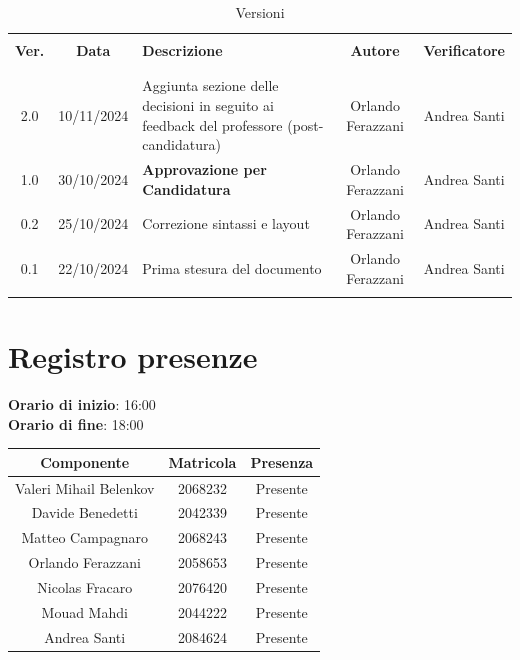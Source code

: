 \documentclass[italian, 12pt]{article}
\begin{document}
\pagestyle{mystyle}


\begin{table}[!h]
	\caption{Versioni}
	\begin{center}
		\begin{tabular}{ c c p{6.2cm} c c}
			\hline \\[-2ex]
			\textbf{Ver.} & \textbf{Data} & \textbf{Descrizione} & \textbf{Autore} & \textbf{Verificatore}  \\
			\\[-2ex] \hline \\[-1.5ex]
            2.0 & 10/11/2024 & Aggiunta sezione delle decisioni in seguito ai feedback del professore (post-candidatura) & Orlando Ferazzani & Andrea Santi\\
            1.0 & 30/10/2024 & \textbf{Approvazione per Candidatura} & Orlando Ferazzani & Andrea Santi\\
            0.2 & 25/10/2024 & Correzione sintassi e layout & Orlando Ferazzani & Andrea Santi\\
			0.1 & 22/10/2024 & Prima stesura del documento & Orlando Ferazzani & Andrea Santi\\
			\\[-1.5ex] \hline
		\end{tabular}
	\end{center}
\end{table}


\tableofcontents
\newpage


\section{Registro presenze}

\textbf{Orario di inizio}: 16:00\\
\textbf{Orario di fine}: 18:00\\


\begin{flushleft}
	\begin{table}[!h]
	\begin{tabular}{ |c|c|c| } 
		\hline
		\textbf{Componente} & \textbf{Matricola} & \textbf{Presenza} \\
  \hline 
		Valeri Mihail Belenkov & 2068232 & Presente \\ 
		Davide Benedetti 	& 2042339 & Presente \\
		Matteo Campagnaro	& 2068243 & Presente \\
		Orlando Ferazzani 	& 2058653 & Presente \\
		Nicolas Fracaro 	& 2076420 & Presente \\
		Mouad Mahdi		    & 2044222 & Presente \\ 
		Andrea Santi 	    & 2084624 & Presente \\
		\hline
	\end{tabular}
	\end{table}
	\end{flushleft}
\end{document}
